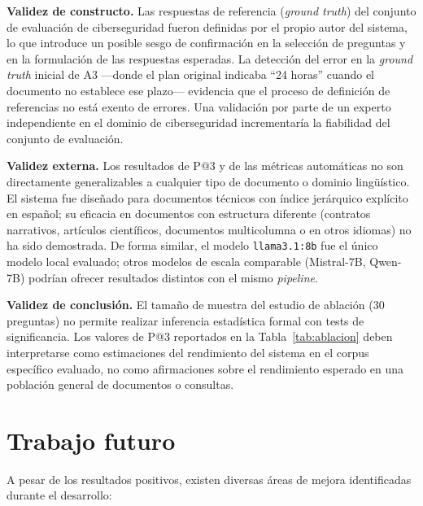 \textbf{Validez de constructo.} Las respuestas de referencia (\textit{ground truth}) del conjunto de evaluación de ciberseguridad fueron definidas por el propio autor del sistema, lo que introduce un posible sesgo de confirmación en la selección de preguntas y en la formulación de las respuestas esperadas. La detección del error en la \textit{ground truth} inicial de A3 —donde el plan original indicaba ``24 horas'' cuando el documento no establece ese plazo— evidencia que el proceso de definición de referencias no está exento de errores. Una validación por parte de un experto independiente en el dominio de ciberseguridad incrementaría la fiabilidad del conjunto de evaluación.

\textbf{Validez externa.} Los resultados de P@3 y de las métricas automáticas no son directamente generalizables a cualquier tipo de documento o dominio lingüístico. El sistema fue diseñado para documentos técnicos con índice jerárquico explícito en español; su eficacia en documentos con estructura diferente (contratos narrativos, artículos científicos, documentos multicolumna o en otros idiomas) no ha sido demostrada. De forma similar, el modelo \texttt{llama3.1:8b} fue el único modelo local evaluado; otros modelos de escala comparable (Mistral-7B, Qwen-7B) podrían ofrecer resultados distintos con el mismo \textit{pipeline}.

\textbf{Validez de conclusión.} El tamaño de muestra del estudio de ablación (30 preguntas) no permite realizar inferencia estadística formal con tests de significancia. Los valores de P@3 reportados en la Tabla~\ref{tab:ablacion} deben interpretarse como estimaciones del rendimiento del sistema en el corpus específico evaluado, no como afirmaciones sobre el rendimiento esperado en una población general de documentos o consultas.

\section{Trabajo futuro}

A pesar de los resultados positivos, existen diversas áreas de mejora identificadas durante el desarrollo:

